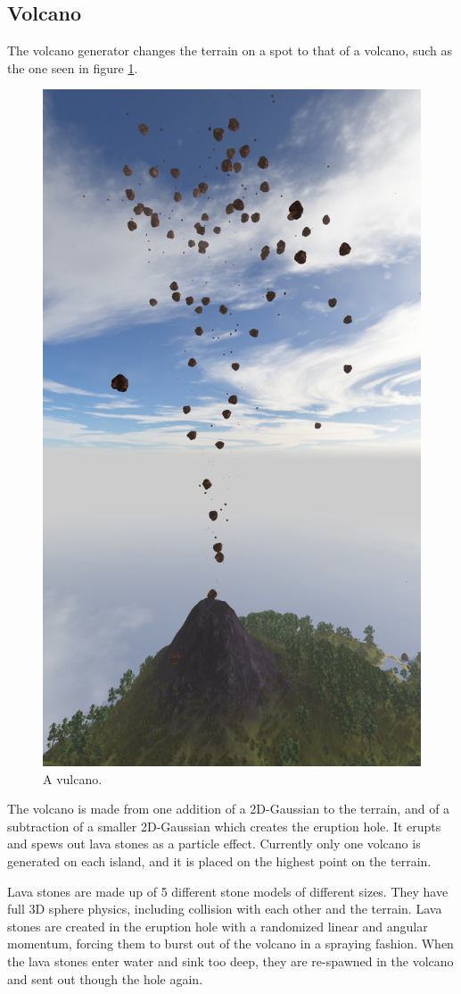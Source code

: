 \newpage
\subsection{Volcano}
The volcano generator changes the terrain on a spot to that of a volcano, such as the one seen in figure \ref{fig:volcano1}.
\begin{figure}[H]
  \centering
  \includegraphics[width=0.7\linewidth]{images/volcano.jpg}
  \caption{A vulcano.}
  \label{fig:volcano1}
\end{figure}%
\newpage
The volcano is made from one addition of a 2D-Gaussian to the terrain, and of a subtraction of a smaller 2D-Gaussian which creates the eruption hole. It erupts and spews out lava stones as a particle effect. Currently only one volcano is generated on each island, and it is placed on the highest point on the terrain.

Lava stones are made up of 5 different stone models of different sizes. They have full 3D sphere physics, including collision with each other and the terrain. Lava stones are created in the eruption hole with a randomized linear and angular momentum, forcing them to burst out of the volcano in a spraying fashion. When the lava stones enter water and sink too deep, they are re-spawned in the volcano and sent out though the hole again.

